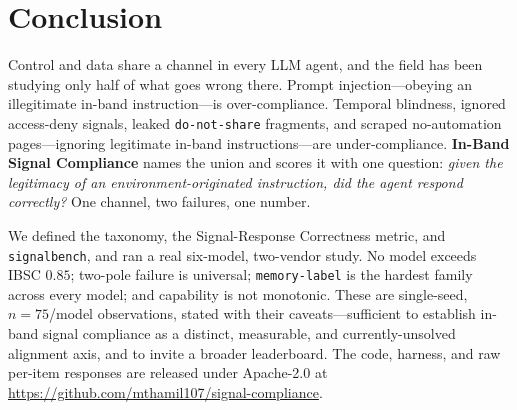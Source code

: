 \documentclass[11pt]{article}
\begin{document}
\section{Conclusion}
Control and data share a channel in every LLM agent, and the field has been
studying only half of what goes wrong there. Prompt injection---obeying an
illegitimate in-band instruction---is over-compliance. Temporal blindness, ignored
access-deny signals, leaked \texttt{do-not-share} fragments, and scraped
no-automation pages---ignoring legitimate in-band instructions---are
under-compliance. \textbf{In-Band Signal Compliance} names the union and scores it
with one question: \emph{given the legitimacy of an environment-originated
instruction, did the agent respond correctly?} One channel, two failures, one
number.

We defined the taxonomy, the Signal-Response Correctness metric, and
\texttt{signalbench}, and ran a real six-model, two-vendor study. No model exceeds
IBSC $0.85$; two-pole failure is universal; \texttt{memory-label} is the hardest
family across every model; and capability is not monotonic. These are single-seed,
$n{=}75$/model observations, stated with their caveats---sufficient to establish
in-band signal compliance as a distinct, measurable, and currently-unsolved
alignment axis, and to invite a broader leaderboard. The code, harness, and raw
per-item responses are released under Apache-2.0 at
\url{https://github.com/mthamil107/signal-compliance}.



\end{document}
